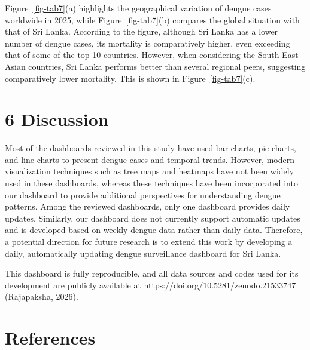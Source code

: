 \documentclass[
]{article}
\begin{document}
Figure~\ref{fig-tab7}(a) highlights the geographical variation of dengue
cases worldwide in 2025, while Figure~\ref{fig-tab7}(b) compares the
global situation with that of Sri Lanka. According to the figure,
although Sri Lanka has a lower number of dengue cases, its mortality is
comparatively higher, even exceeding that of some of the top 10
countries. However, when considering the South-East Asian countries, Sri
Lanka performs better than several regional peers, suggesting
comparatively lower mortality. This is shown in
Figure~\ref{fig-tab7}(c).

\section{6 Discussion}\label{discussion}

Most of the dashboards reviewed in this study have used bar charts, pie
charts, and line charts to present dengue cases and temporal trends.
However, modern visualization techniques such as tree maps and heatmaps
have not been widely used in these dashboards, whereas these techniques
have been incorporated into our dashboard to provide additional
perspectives for understanding dengue patterns. Among the reviewed
dashboards, only one dashboard provides daily updates. Similarly, our
dashboard does not currently support automatic updates and is developed
based on weekly dengue data rather than daily data. Therefore, a
potential direction for future research is to extend this work by
developing a daily, automatically updating dengue surveillance dashboard
for Sri Lanka.

This dashboard is fully reproducible, and all data sources and codes
used for its development are publicly available at
https://doi.org/10.5281/zenodo.21533747 (Rajapaksha, 2026).

\section*{References}\label{references}
\end{document}
